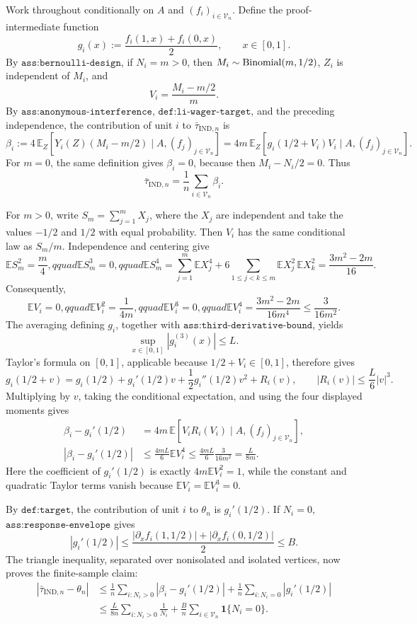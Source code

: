Work throughout conditionally on \(A\) and \((f_i)_{i\in\mathcal V_n}\).  Define the proof-intermediate function
\[
g_i(x):=\frac{f_i(1,x)+f_i(0,x)}{2},\qquad x\in[0,1].
\]
By \(\texttt{ass:bernoulli-design}\), if \(N_i=m>0\), then \(M_i\sim {\rm Binomial}(m,1/2)\), \(Z_i\) is independent of \(M_i\), and
\[
V_i=\frac{M_i-m/2}{m}.
\]
By \(\texttt{ass:anonymous-interference}\), \(\texttt{def:li-wager-target}\), and the preceding independence, the contribution of unit \(i\) to \(\bar\tau_{\mathrm{IND},n}\) is
\[
\beta_i
:=4\,\mathbb E_Z\!\left[Y_i(Z)(M_i-m/2)\mid A,(f_j)_{j\in\mathcal V_n}\right]
=4m\,\mathbb E_Z\!\left[g_i(1/2+V_i)V_i\mid A,(f_j)_{j\in\mathcal V_n}\right].
\]
For \(m=0\), the same definition gives \(\beta_i=0\), because then \(M_i-N_i/2=0\).  Thus
\[
\bar\tau_{\mathrm{IND},n}=\frac1n\sum_{i\in\mathcal V_n}\beta_i.
\]

For \(m>0\), write \(S_m=\sum_{j=1}^m X_j\), where the \(X_j\) are independent and take the values \(-1/2\) and \(1/2\) with equal probability.  Then \(V_i\) has the same conditional law as \(S_m/m\).  Independence and centering give
\[
\mathbb E S_m^2=\frac m4,qquad
\mathbb E S_m^3=0,qquad
\mathbb E S_m^4
=\sum_{j=1}^m\mathbb E X_j^4
+6\sum_{1\le j<k\le m}\mathbb E X_j^2\,\mathbb E X_k^2
=\frac{3m^2-2m}{16}.
\]
Consequently,
\[
\mathbb E V_i=0,qquad
\mathbb E V_i^2=\frac1{4m},qquad
\mathbb E V_i^3=0,qquad
\mathbb E V_i^4=\frac{3m^2-2m}{16m^4}\le \frac{3}{16m^2}.
\]
The averaging defining \(g_i\), together with \(\texttt{ass:third-derivative-bound}\), yields
\[
\sup_{x\in[0,1]}|g_i^{(3)}(x)|\le L.
\]
Taylor's formula on \([0,1]\), applicable because \(1/2+V_i\in[0,1]\), therefore gives
\[
g_i(1/2+v)
=g_i(1/2)+g_i'(1/2)v+\frac12g_i''(1/2)v^2+R_i(v),
\qquad |R_i(v)|\le\frac L6|v|^3.
\]
Multiplying by \(v\), taking the conditional expectation, and using the four displayed moments gives
\[
\begin{aligned}
\beta_i-g_i'(1/2)
&=4m\,\mathbb E\!\left[V_iR_i(V_i)\mid A,(f_j)_{j\in\mathcal V_n}\right],\\
|\beta_i-g_i'(1/2)|
&\le \frac{4mL}{6}\mathbb E V_i^4
\le \frac{4mL}{6}\frac{3}{16m^2}
=\frac{L}{8m}.
\end{aligned}
\]
Here the coefficient of \(g_i'(1/2)\) is exactly \(4m\mathbb E V_i^2=1\), while the constant and quadratic Taylor terms vanish because \(\mathbb E V_i=\mathbb E V_i^3=0\).

By \(\texttt{def:target}\), the contribution of unit \(i\) to \(\theta_n\) is \(g_i'(1/2)\).  If \(N_i=0\), \(\texttt{ass:response-envelope}\) gives
\[
|g_i'(1/2)|
\le \frac{|\partial_x f_i(1,1/2)|+|\partial_x f_i(0,1/2)|}{2}
\le B.
\]
The triangle inequality, separated over nonisolated and isolated vertices, now proves the finite-sample claim:
\[
\begin{aligned}
|\bar\tau_{\mathrm{IND},n}-\theta_n|
&\le \frac1n\sum_{i:N_i>0}|\beta_i-g_i'(1/2)|
+\frac1n\sum_{i:N_i=0}|g_i'(1/2)|\\
&\le \frac{L}{8n}\sum_{i:N_i>0}\frac1{N_i}
+\frac Bn\sum_{i\in\mathcal V_n}\mathbf 1\{N_i=0\}.
\end{aligned}
\]

